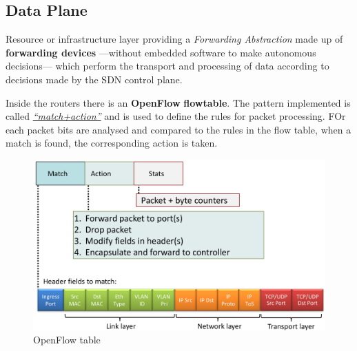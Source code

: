 \newpage
\subsection{Data Plane}
Resource or infrastructure layer providing a \textit{Forwarding Abstraction} made up of \textbf{forwarding devices} ---without embedded software to make autonomous decisions--- which perform the transport and processing of data according to decisions made by the SDN control plane.

\begin{paracol}{2}
   
   \colfill
   Inside the routers there is an \textbf{OpenFlow} \textbf{flow\footnotemark[1] table}.
   The pattern implemented is called \ul{\textit{``match+action''}} and is used to define the rules for packet processing. FOr each packet bits are analysed and compared to the rules in the flow table, when a match is found, the corresponding action is taken.
   \colfill
   \switchcolumn
   \begin{figure}[htbp]
   \centering
   \includegraphics{images/openflow_table.png}
   \caption{OpenFlow table}
   \label{fig:openflow_table}
   \end{figure}
\end{paracol}

